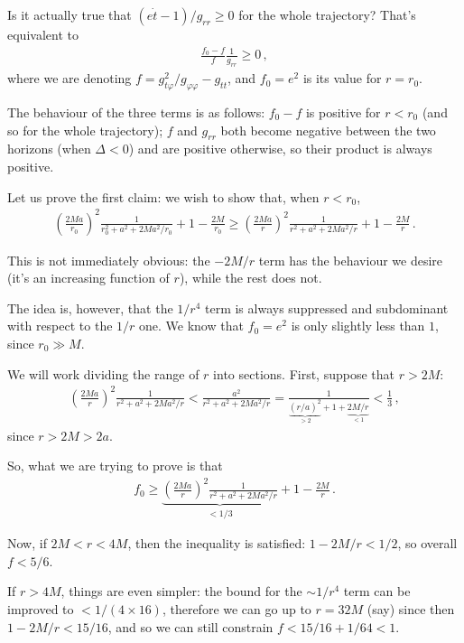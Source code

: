 \documentclass[main.tex]{subfiles}
\begin{document}
Is it actually true that \((e \dot{t} - 1) / g_{rr} \geq 0\) for the whole trajectory? That's equivalent to 
%
\begin{align}
\frac{f_0 - f }{f} \frac{1}{g_{rr} } \geq 0 
\,,
\end{align}
%
where we are denoting \(f = g_{t \varphi }^2 / g_{\varphi \varphi} - g_{tt}\), and \(f_0 = e^2\) is its value for \(r = r_0 \).

The behaviour of the three terms is as follows: \(f_0 - f\) is positive for \(r < r_0 \) (and so for the whole trajectory); 
\(f\) and \(g_{rr}\) both become negative between the two horizons (when \(\Delta < 0\)) and are positive otherwise, so their product is always positive.

Let us prove the first claim: we wish to show that, when \(r < r_0 \),
%
\begin{align}
\left(\frac{2Ma}{r_0 }\right)^2 \frac{1}{r_0 ^2 + a^2 + 2Ma^2 /r_0 } +1 - \frac{2M}{r_0 } 
\geq 
\left(\frac{2Ma}{r}\right)^2 \frac{1}{r^2 + a^2 + 2Ma^2 /r} +1 - \frac{2M}{r}
\,.
\end{align}

This is not immediately obvious: the \(-2M/r\) term has the behaviour we desire (it's an increasing function of \(r\)), while the rest does not.

The idea is, however, that the \(1/r^4\) term is always suppressed and subdominant with respect to the \(1/r\) one. 
We know that \(f_0 = e^2\) is only slightly less than \(1\), since \(r_0 \gg M\). 

We will work dividing the range of \(r\) into sections.
First, suppose that \(r > 2M\):
%
\begin{align}
\left(\frac{2Ma}{r}\right)^2 \frac{1}{r^2 + a^2 + 2Ma^2 /r} < 
\frac{a^2}{r^2 + a^2 + 2Ma^2 /r} = 
\frac{1}{\underbrace{(r/a)^2}_{>2} + 1 + \underbrace{2M/r}_{<1}} < \frac{1}{3}
\,,
\end{align}
%
since \(r > 2M > 2a\). 

So, what we are trying to prove is that 
%
\begin{align}
f_0 \geq \underbrace{\left(\frac{2Ma}{r}\right)^2 \frac{1}{r^2 + a^2 + 2Ma^2 /r}}_{< 1/3} + 1 - \frac{2M}{r}
\,.
\end{align}

Now, if \(2M < r < 4M\), then the inequality is satisfied: \(1 - 2M/r < 1/2\), so overall \(f < 5/6\). 

If \(r > 4M\), things are even simpler: the bound for the \(\sim 1/ r^4\) term can be improved to \(< 1/(4 \times 16)\), therefore we can go up to \(r = 32M\) (say) since then \(1 - 2M/r < 15/16\), and so we can still constrain \(f < 15/16 + 1/64 < 1\). 
\end{document}
